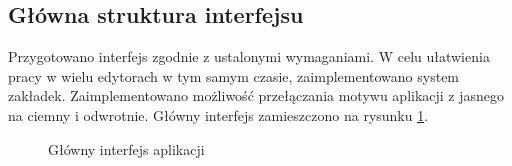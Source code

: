 \subsection{Główna struktura interfejsu}

Przygotowano interfejs zgodnie z ustalonymi wymaganiami. W celu ułatwienia pracy w wielu edytorach w
tym samym czasie, zaimplementowano system zakładek. Zaimplementowano możliwość przełączania motywu
aplikacji z jasnego na ciemny i odwrotnie. Główny interfejs zamieszczono na rysunku
\ref{mainInterfaceFigure}.

\begin{figure}
    \centering
    \qquad

    \caption{Główny interfejs aplikacji}
    \label{mainInterfaceFigure}
\end{figure}

